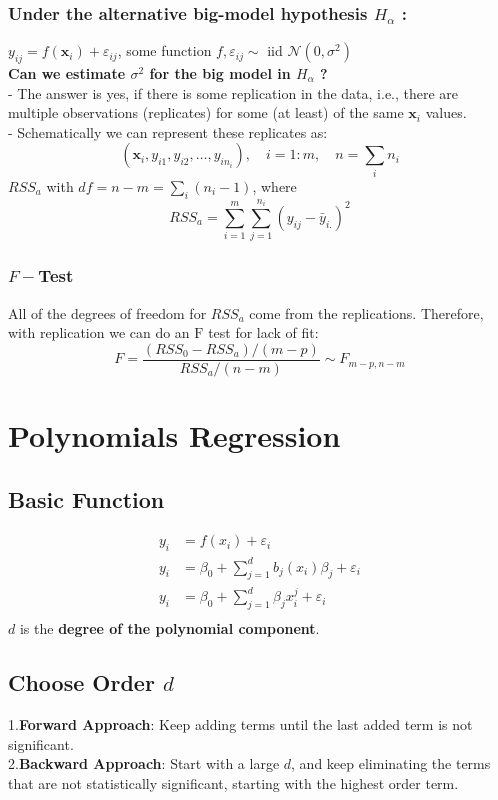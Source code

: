 \documentclass[11pt,a4paper]{article}
\begin{document}
\subsubsection{Under the alternative big-model hypothesis $H_{\alpha}$ :}
$y_{i j}=f\left(\mathbf{x}_{i}\right)+\varepsilon_{i j}$, some function $f, \varepsilon_{i j} \sim$ iid $\mathcal{N}\left(0, \sigma^{2}\right)$\\
\textbf{Can we estimate $\sigma^{2}$ for the big model in $H_{\alpha}$ ?}\\
- The answer is yes, if there is some replication in the data, i.e., there are multiple observations (replicates) for some (at least) of the same $\mathbf{x}_{i}$ values.\\
- Schematically we can represent these replicates as:
$$
\left(\mathbf{x}_{i}, y_{i 1}, y_{i 2}, \ldots, y_{i n_{i}}\right), \quad i=1: m, \quad n=\sum_{i} n_{i}
$$
$R S S_{a}$ with $d f=n-m=\sum_{i}\left(n_{i}-1\right)$, where
$$
R S S_{a}=\sum_{i=1}^{m} \sum_{j=1}^{n_{i}}\left(y_{i j}-\bar{y}_{i .}\right)^{2}
$$
\subsubsection{$F-$Test}
All of the degrees of freedom for $R S S_{a}$ come from the replications. Therefore, with replication we can do an $\mathrm{F}$ test for lack of fit:
$$
F=\frac{\left(R S S_{0}-R S S_{a}\right) /(m-p)}{R S S_{a} /(n-m)} \sim F_{m-p, n-m}
$$

\section{Polynomials Regression}
\subsection{Basic Function}
\begin{equation}
    \begin{aligned}
        y_i&=f(x_i)+\varepsilon_i\\
        y_i&=\beta_0+\sum_{j=1}^db_j(x_i)\beta_j+\varepsilon_i\\
        y_i&=\beta_0+\sum_{j=1}^d\beta_j
        x_i^j+\varepsilon_i\\
    \end{aligned}
    \nonumber
\end{equation}
$d$ is the \textbf{degree of the polynomial component}.\\
\subsection{Choose Order $d$}
1.\textbf{Forward Approach}: Keep adding terms until the last added term is not signiﬁcant.\\
2.\textbf{Backward Approach}: Start with a large $d$, and keep eliminating the terms that are not statistically signiﬁcant, starting with the highest order term.\\
\end{document}
